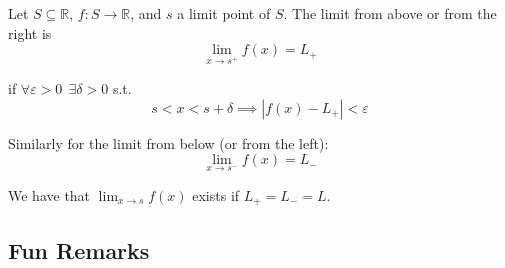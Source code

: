 \documentclass{article}
\begin{document}
\begin{definition}
  Let $S \subseteq \mathbb{R}$, $f: S \to \mathbb{R}$, and $s$ a limit point of $S$. The limit from above or from the right is
  \[
    \lim_{x \to s^+} f(x) = L_+
  \]

  if $\forall \varepsilon > 0 ~~ \exists \delta > 0$ s.t.
  \[
    s < x < s + \delta
    \implies
    |f(x) - L_+| < \varepsilon
  \]

  Similarly for the limit from below (or from the left):
  \[
    \lim_{x \to s^-} f(x) = L_-
  \]

  We have that $\lim_{x \to s} f(x)$ exists if $L_{+} = L_{-} = L$.
\end{definition}

\subsection{Fun Remarks}
\label{sub:fun_remarks}
\end{document}
